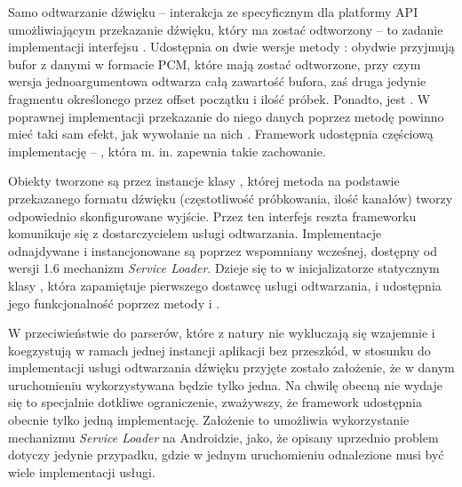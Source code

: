 

Samo odtwarzanie dźwięku -- interakcja ze specyficznym dla platformy API umożliwiającym przekazanie
dźwięku, który ma zostać odtworzony -- to zadanie implementacji interfejsu .
Udostępnia on dwie wersje metody : obydwie przyjmują bufor z danymi w formacie PCM,
które mają zostać odtworzone, przy czym wersja jednoargumentowa odtwarza całą zawartość bufora, zaś
druga jedynie fragmentu określonego przez offset początku i ilość próbek. Ponadto,
 jest . W poprawnej implementacji przekazanie do niego danych
poprzez metodę  powinno mieć taki sam efekt, jak wywołanie na nich .
Framework udostępnia częściową implementację -- , która m. in. zapewnia
takie zachowanie.

Obiekty  tworzone są przez instancje klasy , której metoda
 na podstawie przekazanego formatu dźwięku (częstotliwość próbkowania, ilość
kanałów) tworzy odpowiednio skonfigurowane wyjście. Przez ten interfejs reszta frameworku komunikuje
się z dostarczycielem usługi odtwarzania. Implementacje odnajdywane i instancjonowane są poprzez
wspomniany wcześnej, dostępny od wersji 1.6 mechanizm \emph{Service Loader}. Dzieje się to w
inicjalizatorze statycznym klasy , która zapamiętuje pierwszego dostawcę usługi
odtwarzania, i udostępnia jego funkcjonalność poprzez metody  i .

\begin{Note}
W przeciwieństwie do parserów, które z natury nie wykluczają się wzajemnie i koegzystują w ramach
jednej instancji aplikacji bez przeszkód, w stosunku do implementacji usługi odtwarzania dźwięku
przyjęte zostało założenie, że w danym uruchomieniu wykorzystywana będzie tylko jedna. Na chwilę
obecną nie wydaje się to specjalnie dotkliwe ograniczenie, zważywszy, że framework udostępnia
obecnie tylko jedną implementację. Założenie to umożliwia wykorzystanie mechanizmu \emph{Service
Loader} na Androidzie, jako, że opisany uprzednio problem dotyczy jedynie przypadku, gdzie w jednym
uruchomieniu odnalezione musi być wiele implementacji usługi.  
\end{Note}

